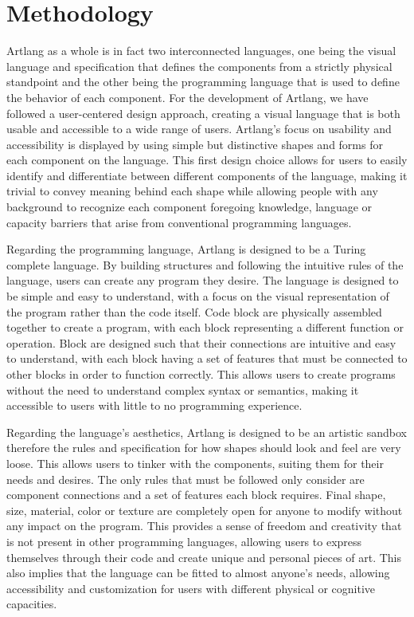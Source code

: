 \section{Methodology}
\label{sec:methodology}

Artlang as a whole is in fact two interconnected languages, one being the visual language and specification that defines the components from a strictly physical standpoint and the other being the programming language that is used to define the behavior of each component.
For the development of Artlang, we have followed a user-centered design approach, creating a visual language that is both usable and accessible to a wide range of users.
Artlang's focus on usability and accessibility is displayed by using simple but distinctive shapes and forms for each component on the language.
This first design choice allows for users to easily identify and differentiate between different components of the language, making it trivial to convey meaning behind each shape while allowing people with any background to recognize each component foregoing knowledge, language or capacity barriers that arise from conventional programming languages.

Regarding the programming language, Artlang is designed to be a Turing complete language. 
By building structures and following the intuitive rules of the language, users can create any program they desire. 
The language is designed to be simple and easy to understand, with a focus on the visual representation of the program rather than the code itself.
Code block are physically assembled together to create a program, with each block representing a different function or operation. Block are designed such that their connections are intuitive and easy to understand, with each block having a set of features that must be connected to other blocks in order to function correctly.
This allows users to create programs without the need to understand complex syntax or semantics, making it accessible to users with little to no programming experience.


Regarding the language's aesthetics, Artlang is designed to be an artistic sandbox therefore the rules and specification for how shapes should look and feel are very loose. This allows users to tinker with the components, suiting them for their needs and desires.
The only rules that must be followed only consider are component connections and a set of features each block requires. Final shape, size, material, color or texture are completely open for anyone to modify without any impact on the program.
This provides a sense of freedom and creativity that is not present in other programming languages, allowing users to express themselves through their code and create unique and personal pieces of art.
This also implies that the language can be fitted to almost anyone's needs, allowing accessibility and customization for users with different physical or cognitive capacities.

